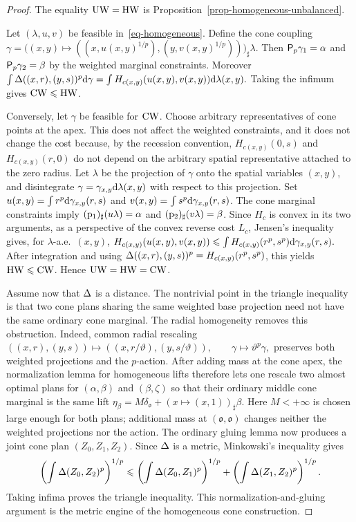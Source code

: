 \begin{proof}
The equality $\operatorname{UW}=\operatorname{HW}$ is Proposition~\ref{prop-homogeneous-unbalanced}.

Let $(\lambda,u,v)$ be feasible in~\eqref{eq-homogeneous}. Define the cone coupling
\(\gamma = \big((x,y)\mapsto ((x,u(x,y)^{1/p}),(y,v(x,y)^{1/p}))\big)_\sharp\lambda.\)
Then $\mathsf P_p\gamma_1=\alpha$ and $\mathsf P_p\gamma_2=\beta$ by the
weighted marginal constraints. Moreover
\(\int \Delta((x,r),(y,s))^p\mathrm{d}\gamma = \int H_{c(x,y)}(u(x,y),v(x,y))\mathrm{d}\lambda(x,y).\)
Taking the infimum gives $\operatorname{CW}\leqslant\operatorname{HW}$.

Conversely, let $\gamma$ be feasible for $\operatorname{CW}$. Choose arbitrary
representatives of cone points at the apex. This does not affect the
weighted constraints, and it does not change the cost because, by the
recession convention, $H_{c(x,y)}(0,s)$ and $H_{c(x,y)}(r,0)$ do not depend
on the arbitrary spatial representative attached to the zero radius. Let
$\lambda$ be the projection of $\gamma$ onto the spatial variables
$(x,y)$, and disintegrate
$\gamma=\gamma_{x,y}\mathrm{d}\lambda(x,y)$ with respect to this projection. Set
$u(x,y)=\int r^p\mathrm{d}\gamma_{x,y}(r,s)$ and $v(x,y)=\int s^p\mathrm{d}\gamma_{x,y}(r,s)$.
The cone marginal constraints imply
$(\mathrm{p}_1)_\sharp(u\lambda)=\alpha$ and
$(\mathrm{p}_2)_\sharp(v\lambda)=\beta$. Since $H_c$ is convex in its two
arguments, as a perspective of the convex reverse cost $L_c$, Jensen's
inequality gives, for $\lambda$-a.e.\ $(x,y)$, \(H_{c(x,y)}(u(x,y),v(x,y)) \leqslant \int H_{c(x,y)}(r^p,s^p)\mathrm{d}\gamma_{x,y}(r,s).\)
After integration and using
$\Delta((x,r),(y,s))^p=H_{c(x,y)}(r^p,s^p)$, this yields
$\operatorname{HW}\leqslant\operatorname{CW}$. Hence $\operatorname{UW}=\operatorname{HW}=\operatorname{CW}$.

Assume now that $\Delta$ is a distance. The nontrivial point in the triangle inequality is that two cone plans sharing the same weighted base projection need not have the same ordinary cone marginal. The radial homogeneity removes this obstruction. Indeed, common radial rescaling
\(((x,r),(y,s))\mapsto((x,r/\vartheta),(y,s/\vartheta)), \qquad \gamma\mapsto\vartheta^p\gamma,\)
preserves both weighted projections and the $p$-action. After adding mass at the cone apex, the normalization lemma for homogeneous lifts therefore lets one rescale two almost optimal plans for $(\alpha,\beta)$ and $(\beta,\zeta)$ so that their ordinary middle cone marginal is the same lift
$\eta_\beta = M\delta_{\mathfrak o} + (x\mapsto(x,1))_\sharp\beta$.
Here $M<+\infty$ is chosen large enough for both plans; additional mass at $(\mathfrak o,\mathfrak o)$ changes neither the weighted projections nor the action. The ordinary gluing lemma now produces a joint cone plan $(Z_0,Z_1,Z_2)$. Since $\Delta$ is a metric, Minkowski's inequality gives
\[
\left(\int\Delta(Z_0,Z_2)^p\right)^{1/p}
\leqslant
\left(\int\Delta(Z_0,Z_1)^p\right)^{1/p}
+
\left(\int\Delta(Z_1,Z_2)^p\right)^{1/p}.
\]
Taking infima proves the triangle inequality. This normalization-and-gluing argument is the metric engine of the homogeneous cone construction.


\end{proof}
